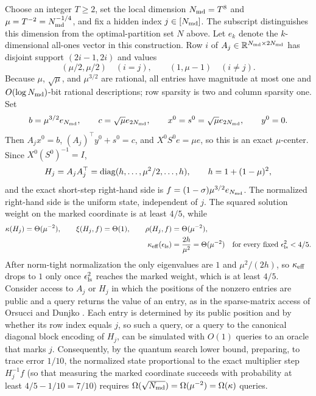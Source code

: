 Choose an integer $T\geq2$, set the local dimension
$N_{\rm md}=T^8$ and $\mu=T^{-2}=N_{\rm md}^{-1/4}$, and fix a hidden index
$j\in[N_{\rm md}]$.  The subscript distinguishes this dimension from the
optimal-partition set $N$ above.  Let $e_k$ denote the $k$-dimensional
all-ones vector in this construction.  Row $i$ of
$A_j\in\mathbb{R}^{N_{\rm md}\times2N_{\rm md}}$ has disjoint support
$(2i-1,2i)$ and values
\begin{equation}
 (\mu/2,\mu/2)\quad(i=j),\qquad
 (1,\mu-1)\quad(i\ne j).
 \label{eq:marked-diagonal-A}
\end{equation}
Because $\mu$, $\sqrt\mu$, and $\mu^{3/2}$ are rational, all entries have
magnitude at most one and $O(\log N_{\rm md})$-bit rational descriptions;
row sparsity is two and column sparsity one.  Set
\[
 b=\mu^{3/2}e_{N_{\rm md}},\qquad
 c=\sqrt\mu e_{2N_{\rm md}},\qquad
 x^0=s^0=\sqrt\mu e_{2N_{\rm md}},\qquad y^0=0.
\]
Then $A_jx^0=b$, $(A_j)^\top y^0+s^0=c$, and
$X^0S^0e=\mu e$, so this is an exact $\mu$-center.  Since
$X^0(S^0)^{-1}=I$,
\begin{equation}
 H_j=A_jA_j^\top
 =\operatorname{diag}(h,\ldots,\mu^2/2,\ldots,h),
 \qquad h=1+(1-\mu)^2,
 \label{eq:marked-diagonal-H}
\end{equation}
and the exact short-step right-hand side is
$f=(1-\sigma)\mu^{3/2}e_{N_{\rm md}}$.  The normalized right-hand side is the
uniform state, independent of $j$.  The squared solution weight on the marked
coordinate is at least $4/5$, while
\[
 \begin{aligned}
 \kappa(H_j)=\Theta(\mu^{-2}),\qquad
 \xi(H_j,f)=\Theta(1),\qquad
 \rho(H_j,f)&=\Theta(\mu^{-2}),\\
 \kappa_{\rm eff}(\epsilon_{\rm ls})
 &=\frac{2h}{\mu^2}=\Theta(\mu^{-2})
 \quad\text{for every fixed }\epsilon_{\rm ls}^2<4/5.
 \end{aligned}
\]
After norm-tight normalization the only eigenvalues are $1$ and
$\mu^2/(2h)$, so $\kappa_{\rm eff}$ drops to $1$ only once
$\epsilon_{\rm ls}^2$ reaches the marked weight, which is at least $4/5$.
Consider access to $A_j$ or $H_j$ in which the positions of the nonzero
entries are public and a query returns the value of an entry, as in the
sparse-matrix access of Orsucci and Dunjko
\cite[Definition~4]{orsucci2021-on-solving-classes-of-positive}.  Each entry
is determined by its public position and by whether its row index equals $j$,
so such a query, or a query to the canonical diagonal block encoding of
$H_j$, can be simulated with $O(1)$ queries to an oracle that marks $j$.
Consequently, by the quantum search lower bound, preparing, to trace
error $1/10$, the normalized state proportional to the exact multiplier step
$H_j^{-1}f$ (so that measuring the
marked coordinate succeeds with probability at least $4/5-1/10=7/10$)
requires
$\Omega(\sqrt{N_{\rm md}})=\Omega(\mu^{-2})=\Omega(\kappa)$ queries.

